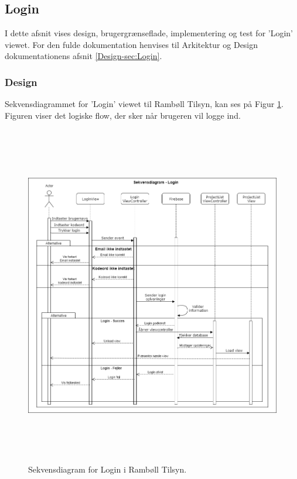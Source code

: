 \subsection{Login}
I dette afsnit vises design, brugergrænseflade, implementering og test for 'Login' viewet. For den fulde dokumentation henvises til Arkitektur og Design dokumentationens afsnit \ref{Design-sec:Login}.
\subsubsection{Design}
Sekvensdiagrammet for 'Login' viewet til Rambøll Tilsyn, kan ses på Figur \ref{fig:LoginSekvens}. Figuren viser det logiske flow, der sker når brugeren vil logge ind.
\begin{figure}[H] %
	\centering
	\includegraphics[height=15cm, width=15cm]{Design/Applikation/Login/LoginSekvensDiagram}
	\caption{Sekvensdiagram for Login i Rambøll Tilsyn.}
	\label{fig:LoginSekvens}
\end{figure}

\clearpage

